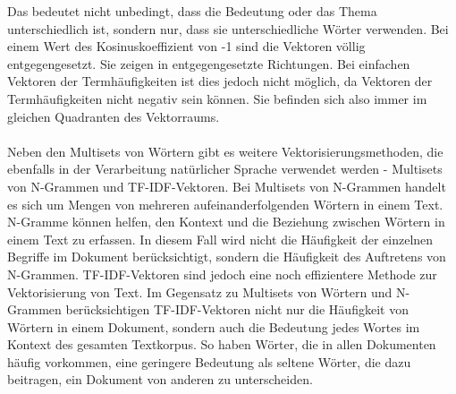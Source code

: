 Das bedeutet nicht unbedingt, dass die Bedeutung oder das Thema unterschiedlich ist, sondern nur, dass sie unterschiedliche Wörter verwenden. 
Bei einem Wert des Kosinuskoeffizient von -1 sind die Vektoren völlig entgegengesetzt. 
Sie zeigen in entgegengesetzte Richtungen. 
Bei einfachen Vektoren der Termhäufigkeiten ist dies jedoch nicht möglich, da Vektoren der Termhäufigkeiten nicht negativ sein können. 
Sie befinden sich also immer im gleichen Quadranten des Vektorraums. \cite{han_data_2011}\\\\
Neben den Multisets von Wörtern gibt es weitere Vektorisierungsmethoden, die ebenfalls in der Verarbeitung natürlicher Sprache verwendet werden - Multisets von N-Grammen und \ac{TF-IDF}-Vektoren.
Bei Multisets von N-Grammen handelt es sich um Mengen von mehreren aufeinanderfolgenden Wörtern in einem Text. 
N-Gramme können helfen, den Kontext und die Beziehung zwischen Wörtern in einem Text zu erfassen. 
In diesem Fall wird nicht die Häufigkeit der einzelnen Begriffe im Dokument berücksichtigt, sondern die Häufigkeit des Auftretens von N-Grammen.
\ac{TF-IDF}-Vektoren sind jedoch eine noch effizientere Methode zur Vektorisierung von Text. 
Im Gegensatz zu Multisets von Wörtern und N-Grammen berücksichtigen \ac{TF-IDF}-Vektoren nicht nur die Häufigkeit von Wörtern in einem Dokument, sondern auch die Bedeutung jedes Wortes im Kontext des gesamten Textkorpus. 
So haben Wörter, die in allen Dokumenten häufig vorkommen, eine geringere Bedeutung als seltene Wörter, die dazu beitragen, ein Dokument von anderen zu unterscheiden.

